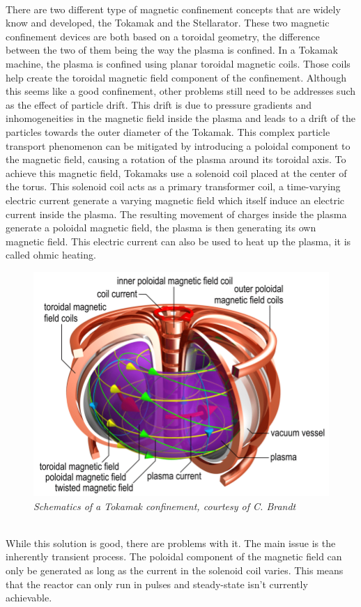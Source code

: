 \\
\break
\normalsize{\indent There are two different type of magnetic confinement concepts that are widely know and developed, the Tokamak and the Stellarator. These two magnetic confinement devices are both based on a toroidal geometry, the difference between the two of them being the way the plasma is confined. In a Tokamak machine, the plasma is confined using planar toroidal magnetic coils. Those coils help create the toroidal magnetic field component of the confinement. Although this seems like a good confinement, other problems still need to be addresses such as the effect of particle drift. This drift is due to  pressure gradients and inhomogeneities in the magnetic field inside the plasma and leads to a drift of the particles towards the outer diameter of the Tokamak. This complex particle transport phenomenon can be mitigated by introducing a poloidal component to the magnetic field, causing a rotation of the plasma around its toroidal axis. To achieve this magnetic field, Tokamaks use a solenoid coil placed at the center of the torus. This solenoid coil acts as a primary transformer coil, a time-varying electric current generate a varying magnetic field which itself induce an electric current inside the plasma. The resulting movement of charges inside the plasma generate a poloidal magnetic field, the plasma is then generating its own magnetic field. This electric current can also be used to heat up the plasma, it is called ohmic heating.}
\break
\begin{figure}[h!]
    \centering
    \includegraphics[width=.6\textwidth]{figures/fig_2.png}
    \caption{\it Schematics of a Tokamak confinement, courtesy of C. Brandt}
\end{figure}
\\
\break
\normalsize{\indent While this solution is good, there are problems with it. The main issue is the inherently transient process. The poloidal component of the magnetic field can only be generated as long as the current in the solenoid coil varies. This means that the reactor can only run in pulses and steady-state isn’t currently achievable.}
